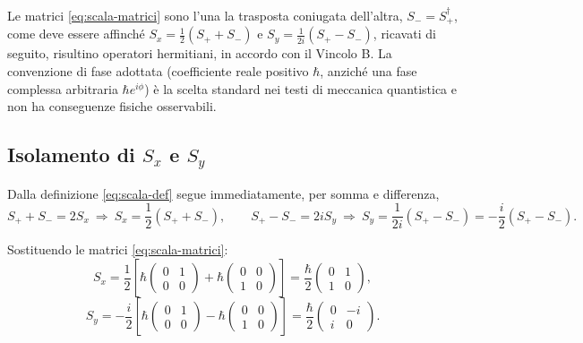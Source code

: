 \documentclass[11pt,a4paper]{article}
\begin{document}
\begin{nota}
Le matrici \eqref{eq:scala-matrici} sono l'una la trasposta coniugata dell'altra, $S_-=S_+^\dagger$, come deve essere affinché $S_x=\tfrac12(S_++S_-)$ e $S_y=\tfrac{1}{2i}(S_+-S_-)$, ricavati di seguito, risultino operatori hermitiani, in accordo con il Vincolo B. La convenzione di fase adottata (coefficiente reale positivo $\hbar$, anziché una fase complessa arbitraria $\hbar e^{i\phi}$) è la scelta standard nei testi di meccanica quantistica e non ha conseguenze fisiche osservabili.
\end{nota}

\subsection{Isolamento di \texorpdfstring{$S_x$}{Sx} e \texorpdfstring{$S_y$}{Sy}}

Dalla definizione \eqref{eq:scala-def} segue immediatamente, per somma e differenza,
\[
S_+ + S_- = 2S_x \ \Longrightarrow\ S_x=\frac12(S_++S_-), \qquad
S_+ - S_- = 2iS_y \ \Longrightarrow\ S_y = \frac{1}{2i}(S_+-S_-) = -\frac{i}{2}(S_+-S_-).
\]

Sostituendo le matrici \eqref{eq:scala-matrici}:
\begin{equation}
S_x = \frac12\left[\hbar\begin{pmatrix}0&1\\0&0\end{pmatrix}+\hbar\begin{pmatrix}0&0\\1&0\end{pmatrix}\right]
= \frac{\hbar}{2}\begin{pmatrix}0&1\\1&0\end{pmatrix},
\label{eq:Sx}
\end{equation}
\begin{equation}
S_y = -\frac{i}{2}\left[\hbar\begin{pmatrix}0&1\\0&0\end{pmatrix}-\hbar\begin{pmatrix}0&0\\1&0\end{pmatrix}\right]
= \frac{\hbar}{2}\begin{pmatrix}0&-i\\i&0\end{pmatrix}.
\label{eq:Sy}
\end{equation}
\end{document}
